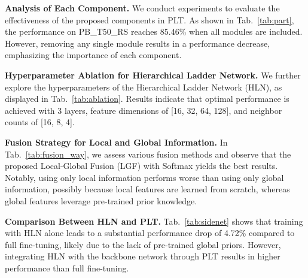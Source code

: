 \textbf{Analysis of Each Component.} We conduct experiments to evaluate the effectiveness of the proposed components in PLT. As shown in Tab.~\ref{tab:part}, the performance on PB\_T50\_RS reaches 85.46\% when all modules are included. However, removing any single module results in a performance decrease, emphasizing the importance of each component.

\textbf{Hyperparameter Ablation for Hierarchical Ladder Network.} We further explore the hyperparameters of the Hierarchical Ladder Network (HLN), as displayed in Tab.~\ref{tab:ablation}. Results indicate that optimal performance is achieved with 3 layers, feature dimensions of [16, 32, 64, 128], and neighbor counts of [16, 8, 4].

\textbf{Fusion Strategy for Local and Global Information.} In Tab.~\ref{tab:fusion_way}, we assess various fusion methods and observe that the proposed Local-Global Fusion (LGF) with Softmax yields the best results. Notably, using only local information performs worse than using only global information, possibly because local features are learned from scratch, whereas global features leverage pre-trained prior knowledge.

\textbf{Comparison Between HLN and PLT.} Tab.~\ref{tab:sidenet} shows that training with HLN alone leads to a substantial performance drop of 4.72\% compared to full fine-tuning, likely due to the lack of pre-trained global priors. However, integrating HLN with the backbone network through PLT results in higher performance than full fine-tuning.




